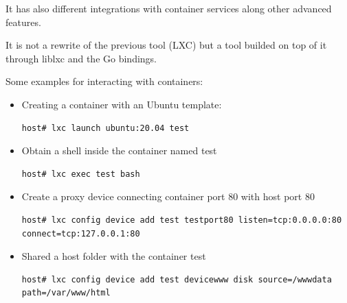 It has also different integrations with container services along other advanced features.

It is not a rewrite of the previous tool (LXC) but a tool builded on top of it through liblxc and the Go bindings.

Some examples for interacting with containers:

\begin{itemize}
	\item{Creating a container with an Ubuntu template}:
	      \begin{verbatim}
host# lxc launch ubuntu:20.04 test
	\end{verbatim}
	\item{Obtain a shell inside the container named test}
	      \begin{verbatim}
host# lxc exec test bash 
	\end{verbatim}
	\item{Create a proxy device connecting container port 80 with host port 80}
	      \begin{verbatim}
host# lxc config device add test testport80 listen=tcp:0.0.0.0:80 connect=tcp:127.0.0.1:80 
	\end{verbatim}
	\item{Shared a host folder with the container test}
	      \begin{verbatim}
host# lxc config device add test devicewww disk source=/wwwdata path=/var/www/html 
	\end{verbatim}
\end{itemize}







